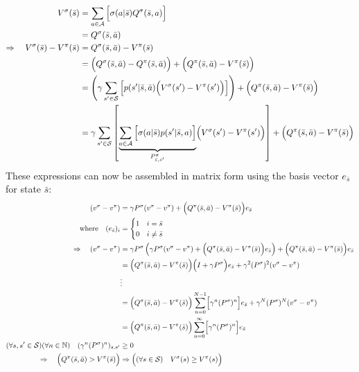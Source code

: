 \begin{align*}
    V^\sigma(\bar{s}) &= \sum_{a\in\mathcal{A}}{\Bigl[ \sigma(a\vert \bar{s}) Q^\sigma(\bar{s}, a) \Bigr]} \\
    &= Q^\sigma(\bar{s}, \bar{a}) \\
    \Rightarrow \quad V^\sigma(\bar{s}) - V^\pi(\bar{s}) &= Q^\sigma(\bar{s}, \bar{a}) - V^\pi(\bar{s}) \\
    &= \Bigl(Q^\sigma(\bar{s}, \bar{a}) - Q^\pi(\bar{s}, \bar{a})\Bigr) + \Bigl(Q^\pi(\bar{s}, \bar{a}) - V^\pi(\bar{s})\Bigr) \\
    &= \left( \gamma \sum_{s'\in\mathcal{S}}{\Bigl[ p(s'\vert \bar{s}, \bar{a}) \Bigl( V^\sigma(s') - V^\pi(s') \Bigr) \Bigr]} \right) + \Bigl(Q^\pi(\bar{s}, \bar{a}) - V^\pi(\bar{s})\Bigr) \\
    &= \gamma\sum_{s'\in\mathcal{S}}{\left[ \underbrace{\sum_{a\in\mathcal{A}}{\Bigl[ \sigma(a\vert \bar{s}) p(s'\vert \bar{s}, a) \Bigr]}}_{P^\sigma_{\bar{s}, s'}} \Bigl( V^\sigma(s') - V^\pi(s') \Bigr) \right]} + \Bigl(Q^\pi(\bar{s}, \bar{a}) - V^\pi(\bar{s})\Bigr) \\
\end{align*}
These expressions can now be assembled in matrix form using the basis vector $e_{\bar{s}}$ for state $\bar{s}$:
\begin{align*}
    (v^\sigma - v^\pi) &= \gamma P^\sigma (v^\sigma - v^\pi) + \Bigl(Q^\pi(\bar{s}, \bar{a}) - V^\pi(\bar{s})\Bigr)e_{\bar{s}} \\
    \text{where} \quad (e_{\bar{s}})_i &= \begin{cases}
        1 & i = \bar{s} \\
        0 & i \ne \bar{s}
    \end{cases} \\
    \Rightarrow \quad (v^\sigma - v^\pi) &= \gamma P^\sigma \left( \gamma P^\sigma (v^\sigma - v^\pi) + \Bigl(Q^\pi(\bar{s}, \bar{a}) - V^\pi(\bar{s})\Bigr)e_{\bar{s}} \right) + \Bigl(Q^\pi(\bar{s}, \bar{a}) - V^\pi(\bar{s})\Bigr)e_{\bar{s}} \\
    &= \Bigl(Q^\pi(\bar{s}, \bar{a}) - V^\pi(\bar{s})\Bigr) \Bigl( I + \gamma P^\sigma \Bigr) e_{\bar{s}} + \gamma^2 (P^\sigma)^2 (v^\sigma - v^\pi) \\
    &\vdots \\
    &= \Bigl(Q^\pi(\bar{s}, \bar{a}) - V^\pi(\bar{s})\Bigr) \sum_{n=0}^{N-1} \Bigl[ \gamma^n (P^\sigma)^n \Bigr] e_{\bar{s}} + \gamma^N (P^\sigma)^N (v^\sigma - v^\pi) \\
    &= \Bigl(Q^\pi(\bar{s}, \bar{a}) - V^\pi(\bar{s})\Bigr) \sum_{n=0}^{\infty} \Bigl[ \gamma^n (P^\sigma)^n \Bigr] e_{\bar{s}} \\
    (\forall s,s'\in\mathcal{S})(\forall n\in\mathbb{N}) \quad (\gamma^n (P^\sigma)^n)_{s,s'} &\ge 0 \\
    \Rightarrow \quad \Bigl(Q^\pi(\bar{s}, \bar{a}) > V^\pi(\bar{s})\Bigr) &\Rightarrow \Bigl( (\forall s\in\mathcal{S}) \quad V^\sigma(s) \ge V^\pi(s) \Bigr)
\end{align*}
